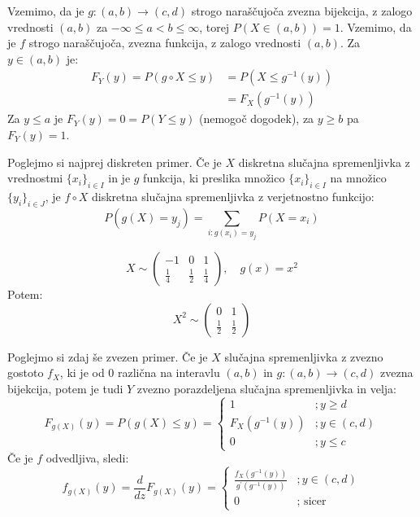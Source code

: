 \documentclass[12pt]{book}
\def\n{\noindent}
\theoremstyle{definition}
\theoremstyle{plain}
\theoremstyle{plain}
\theoremstyle{plain}
\theoremstyle{plain}
\theoremstyle{remark}
\begin{document}
\n Vzemimo, da je $g:(a, b) \to (c,d)$ strogo naraščujoča zvezna bijekcija, z zalogo vrednosti $(a, b)$ za $-\infty \leq a<b \leq \infty$, torej $P(X \in(a, b))=1$. Vzemimo, da je $f$ strogo naraščujoča, zvezna funkcija, z zalogo vrednosti $(a, b)$. Za $y \in (a, b)$ je: 
$$
\begin{aligned}
    F_Y(y)=P(g \circ X \leq y)&=P\left(X \leq g^{-1}(y)\right) \\
    &=F_X\left(g^{-1}(y)\right)
\end{aligned}
$$
Za $y \leq a$ je $F_Y(y)=0=P(Y \leq y)$ (nemogoč dogodek), za $y \geq b$ pa $F_Y(y)=1$.

\n Poglejmo si najprej diskreten primer. Če je $X$ diskretna slučajna spremenljivka z vrednostmi $\{x_i\}_{i \in I}$ in je $g$ funkcija, ki preslika množico $\{x_i\}_{i \in I}$ na množico $\{y_i\}_{i \in J}$, je $f \circ X$ diskretna slučajna spremenljivka z verjetnostno funkcijo:
$$
P\left(g(X)=y_j\right)=\sum_{i: g\left(x_i\right)=y_j} P\left(X=x_i\right)
$$

\begin{zgled}
    $$
    X \sim\left(\begin{array}{ccc}
        -1 & 0 & 1 \\
        \frac{1}{4} & \frac{1}{2} & \frac{1}{4}
        \end{array}\right), \quad  g(x)=x^2
    $$
    Potem: 
    $$
    X^2 \sim \left(\begin{array}{cc}
        0 & 1 \\
        \frac{1}{2} & \frac{1}{2}
        \end{array}\right)
    $$
    \vspace{-4pt}
\end{zgled}

\n Poglejmo si zdaj še zvezen primer. Če je $X$ slučajna spremenljivka z zvezno gostoto $f_X$, ki je od $0$ različna na interavlu $(a,b)$ in $g:(a,b) \to (c,d)$ zvezna bijekcija, potem je tudi $Y$ zvezno porazdeljena slučajna spremenljivka in velja: 
$$
F_{g(X)}(y)=P(g(X) \leq y)=\begin{cases} 1  &; y \geq d \\
    F_X\left(g^{-1}(y)\right) &; y \in(c, d) \\
    0 &; y \leq c \end{cases}
$$
Če je $f$ odvedljiva, sledi: 
$$
f_{g(X)}(y)=\frac{d}{d z} F_{g(X)}(y)=\begin{cases}
    \frac{f_X\left(g^{-1}(y)\right)}{g^{\prime}\left(g^{-1}(y)\right)} &; y \in(c, d) \\
    0 &; \text { sicer }
    \end{cases}
$$
\end{document}
